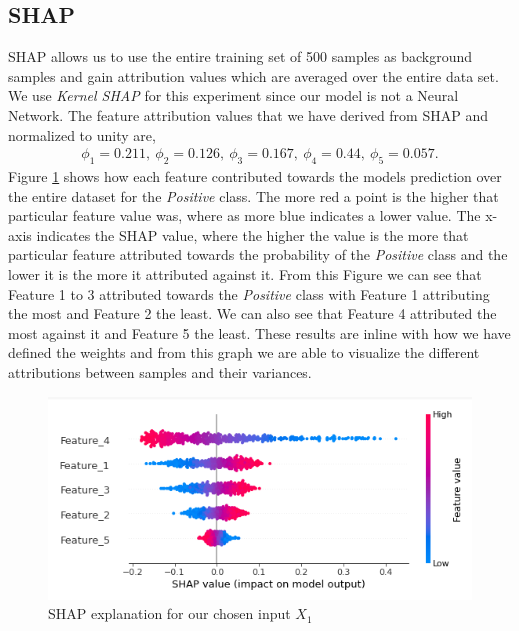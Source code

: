 \subsection{SHAP}
SHAP allows us to use the entire training set of 500 samples as background samples and gain attribution values which are averaged over the entire data set. We use \emph{Kernel SHAP} for this experiment since our model is not a Neural Network. The feature attribution values that we have derived from SHAP and normalized to unity are,
 \begin{align*}
    \phi_1 = 0.211, \ \phi_2 = 0.126, \ \phi_3 = 0.167 ,\ \phi_4 = 0.44, \ \phi_5 = 0.057.
\end{align*}
Figure \ref{fig:shap-ground} shows how each feature contributed towards the models prediction over the entire dataset for the \emph{Positive} class. The more red a point is the higher that particular feature value was, where as more blue indicates a lower value. The x-axis indicates the SHAP value, where the higher the value is the more that particular feature attributed towards the probability of the \emph{Positive} class and the lower it is the more it attributed against it. From this Figure we can see that Feature 1 to 3 attributed towards the \emph{Positive} class with Feature 1 attributing the most and Feature 2 the least. We can also see that Feature 4 attributed the most against it and Feature 5 the least. These results are inline with how we have defined the weights and from this graph we are able to visualize the different attributions between samples and their variances.
\begin  {figure}[!htpb]
  \includegraphics[width=\linewidth]{Evaluation_Images/shap_ground.png}
\caption{SHAP explanation for our chosen input $X_1$}
 \label{fig:shap-ground}
\end{figure}

